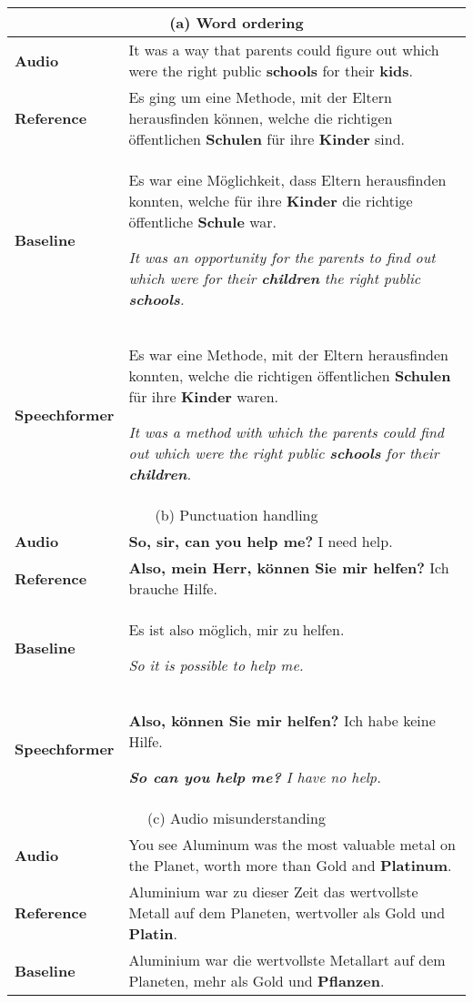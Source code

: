 \documentclass[11pt]{article}
\begin{document}
{
\begin{table*}[h!]
  \centering
  \setlength{\tabcolsep}{1.5pt}
  \small
  \begin{tabular}{p{2cm}|p{13cm}}
      \hline
      \multicolumn{2}{c}{(a) Word ordering} \\
      \hline
      \textbf{Audio} & It was a way that parents could figure out which were the right public \textbf{schools} for their \textbf{kids}. \\
      \textbf{Reference} & Es ging um eine Methode, mit der Eltern herausfinden können, welche die richtigen öffentlichen \textbf{Schulen} für ihre \textbf{Kinder} sind. \\
      \textbf{Baseline} & Es war eine Möglichkeit, dass Eltern herausfinden konnten, welche für ihre \textbf{Kinder} die richtige öffentliche \textbf{Schule} war.
      
      \textit{It was an opportunity for the parents to find out which were for their \textbf{children} the right public \textbf{schools}.}
      \\
      \textbf{Speechformer} & Es war eine Methode, mit der Eltern herausfinden konnten, welche die richtigen öffentlichen \textbf{Schulen} für ihre \textbf{Kinder} waren.
      
      \textit{It was a method with which the parents could find out which were the right public \textbf{schools} for their \textbf{children}.}
      \\
      \hline
  \multicolumn{2}{c}{(b) Punctuation handling} \\
      \hline
      \textbf{Audio} & \textbf{So, sir, can you help me?} I need help. \\
      \textbf{Reference} & \textbf{Also, mein Herr, können Sie mir helfen?} Ich brauche Hilfe. \\
      \textbf{Baseline} & Es ist also möglich, mir zu helfen.
      
      \textit{So it is possible to help me.}
      \\
      \textbf{Speechformer} & \textbf{Also, können Sie mir helfen?} Ich habe keine Hilfe.
      
      \textit{\textbf{So can you help me?} I have no help.}
      \\
      \hline
      \multicolumn{2}{c}{(c) Audio misunderstanding} \\
      \hline
      \textbf{Audio} & You see Aluminum was the most valuable metal on the Planet, worth more than Gold and \textbf{Platinum}. \\
      \textbf{Reference} & Aluminium war zu dieser Zeit das wertvollste Metall auf dem Planeten, wertvoller als Gold und \textbf{Platin}. \\
      \textbf{Baseline} & Aluminium war die wertvollste Metallart auf dem Planeten, mehr als Gold und \textbf{Pflanzen}.
      

\end{tabular}
\end{table*}}
\end{document}
